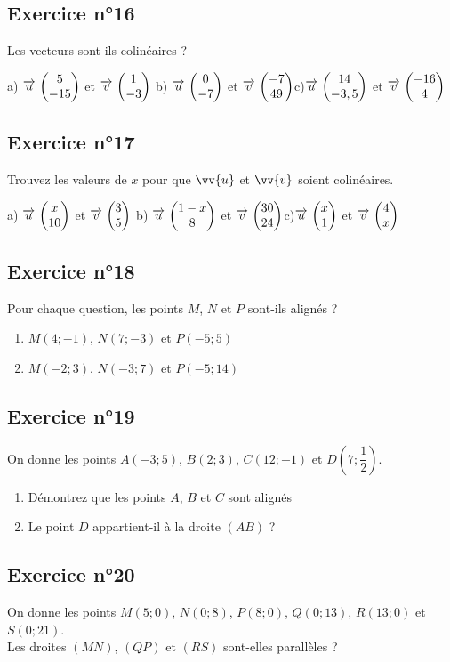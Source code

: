 \documentclass[12pt,a4paper]{article}
\begin{document}
\subsection*{Exercice n°16}

Les vecteurs sont-ils colinéaires ?

 a) $\overrightarrow{u}\, \begin{pmatrix} 5\\ -15 \end{pmatrix}$ et $\overrightarrow{v}\, \begin{pmatrix} 1\\ -3 \end{pmatrix}$ \qquad b) $\overrightarrow{u}\, \begin{pmatrix} 0\\ -7 \end{pmatrix}$ et $\overrightarrow{v}\, \begin{pmatrix} -7\\ 49 \end{pmatrix}$\qquad  c)$\overrightarrow{u}\, \begin{pmatrix} 14\\ -3,5 \end{pmatrix}$ et $\overrightarrow{v}\, \begin{pmatrix} -16\\ 4 \end{pmatrix}$  


\subsection*{Exercice n°17}

Trouvez les valeurs de $x$ pour que $\vv{u}$ et $\vv{v}$ soient colinéaires.

 a) $\overrightarrow{u}\, \begin{pmatrix} x\\ 10 \end{pmatrix}$ et $\overrightarrow{v}\, \begin{pmatrix} 3\\ 5 \end{pmatrix}$ \qquad b) $\overrightarrow{u}\, \begin{pmatrix} 1-x\\ 8 \end{pmatrix}$ et $\overrightarrow{v}\, \begin{pmatrix} 30\\ 24 \end{pmatrix}$\qquad  c)$\overrightarrow{u}\, \begin{pmatrix} x\\ 1 \end{pmatrix}$ et $\overrightarrow{v}\, \begin{pmatrix} 4\\ x \end{pmatrix}$  


\subsection*{Exercice n°18}

Pour chaque question, les points $M$, $N$ et $P$ sont-ils alignés ?

\begin{enumerate}
    \item $M(4;-1)$, $N(7;-3)$ et $P(-5;5)$
    \item $M(-2;3)$, $N(-3;7)$ et $P(-5;14)$
\end{enumerate}


\subsection*{Exercice n°19}
On donne les points $A(-3;5)$, $B(2;3)$, $C(12;-1)$ et $D(7;\dfrac{1}{2})$.

\begin{enumerate}
    \item Démontrez que les points $A$, $B$ et $C$ sont alignés
    \item Le point $D$ appartient-il à la droite $(AB)$ ?
\end{enumerate}

\subsection*{Exercice n°20}
On donne les points $M(5;0)$, $N(0;8)$, $P(8;0)$, $Q(0;13)$, $R(13;0)$ et $S(0;21)$.\\
Les droites $(MN)$, $(QP)$ et $(RS)$ sont-elles parallèles ?
\end{document}
